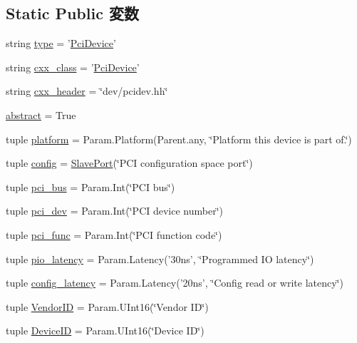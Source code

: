 \subsection*{Static Public 変数}
\begin{DoxyCompactItemize}
\item 
string \hyperlink{classPci_1_1PciDevice_acce15679d830831b0bbe8ebc2a60b2ca}{type} = '\hyperlink{classPci_1_1PciDevice}{PciDevice}'
\item 
string \hyperlink{classPci_1_1PciDevice_a58cd55cd4023648e138237cfc0822ae3}{cxx\_\-class} = '\hyperlink{classPci_1_1PciDevice}{PciDevice}'
\item 
string \hyperlink{classPci_1_1PciDevice_a17da7064bc5c518791f0c891eff05fda}{cxx\_\-header} = \char`\"{}dev/pcidev.hh\char`\"{}
\item 
\hyperlink{classPci_1_1PciDevice_a17fa61ac3806b481cafee5593b55e5d0}{abstract} = True
\item 
tuple \hyperlink{classPci_1_1PciDevice_ae6d09ca44893db6cdb66d62deaa1aefd}{platform} = Param.Platform(Parent.any, \char`\"{}Platform this device is part of.\char`\"{})
\item 
tuple \hyperlink{classPci_1_1PciDevice_ad5f91786d7c873886a576621a2c1b0b5}{config} = \hyperlink{classm5_1_1params_1_1SlavePort}{SlavePort}(\char`\"{}PCI configuration space port\char`\"{})
\item 
tuple \hyperlink{classPci_1_1PciDevice_a538a7615188508d868dc8e9fc8f03ced}{pci\_\-bus} = Param.Int(\char`\"{}PCI bus\char`\"{})
\item 
tuple \hyperlink{classPci_1_1PciDevice_ad03b795fdff18a28678e61a28edbc095}{pci\_\-dev} = Param.Int(\char`\"{}PCI device number\char`\"{})
\item 
tuple \hyperlink{classPci_1_1PciDevice_ad3a2a2ca44f057aad936e91b7fb2efe0}{pci\_\-func} = Param.Int(\char`\"{}PCI function code\char`\"{})
\item 
tuple \hyperlink{classPci_1_1PciDevice_ac3f272675842a6662ce8782e10fdba39}{pio\_\-latency} = Param.Latency('30ns', \char`\"{}Programmed IO latency\char`\"{})
\item 
tuple \hyperlink{classPci_1_1PciDevice_a3b4bc49bf2cdc43fdd15ff76aa37a9fe}{config\_\-latency} = Param.Latency('20ns', \char`\"{}Config read or write latency\char`\"{})
\item 
tuple \hyperlink{classPci_1_1PciDevice_a48f611c5f9d4755971b7c867e4529cc6}{VendorID} = Param.UInt16(\char`\"{}Vendor ID\char`\"{})
\item 
tuple \hyperlink{classPci_1_1PciDevice_aa90d1ebfb6ac8c64983451e2196e342f}{DeviceID} = Param.UInt16(\char`\"{}Device ID\char`\"{})

\end{DoxyCompactItemize}
